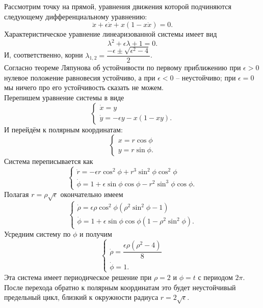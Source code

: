 \begin{example}
    Рассмотрим точку на прямой, уравнения движения которой подчиняются следующему дифференциальному уравнению:
    \[
        \ddot{x} + \epsilon \dot{x} + x(1 - x\dot{x}) = 0.
    \]
    Характеристическое уравнение линеаризованной системы имеет вид
    \[
        \lambda^2 + \epsilon \lambda + 1 = 0.
    \]
    И, соответственно, корни $\lambda_{1, 2} = \dfrac{-\epsilon \pm \sqrt {\epsilon^2 - 4}}{2}$. \\
    Согласно теореме Ляпунова об устойчивости по первому приближению при $\epsilon > 0$ нулевое положение равновесия устойчиво, а при $\epsilon < 0$ -- неустойчиво; при $\epsilon = 0$ мы ничего про его устойчивость сказать не можем. \\
    Перепишем уравнение системы в виде
    \[
        \begin{cases}
            \dot{x} = y \\
            \dot{y} = - \epsilon y - x(1 - xy).
        \end{cases}
    \]
    И перейдём к полярным координатам:
    \[
        \begin{cases}
            x = r \cos \phi \\
            y = r \sin \phi.
        \end{cases}
    \]
    Система переписывается как
    \[
        \begin{cases}
            \dot{r} = -\epsilon r \cos^2 \phi + r^3 \sin^2 \phi \cos^2 \phi \\
            \dot{\phi} = 1 + \epsilon \sin \phi \cos \phi - r^2 \sin^3 \phi \cos \phi.
        \end{cases}
    \]
    Полагая $r = \rho \sqrt {\epsilon}$ окончательно имеем
    \[
        \begin{cases}
            \dot{\rho} = \epsilon \rho \cos^2\phi (\rho^2 \sin^2 \phi - 1) \\
            \dot{\phi} = 1 + \epsilon \sin \phi \cos \phi (1 - \rho^2 \sin^2 \phi).
        \end{cases}
    \]
    Усредним систему по $\phi$ и получим
    \[
        \begin{cases}
            \dot{\rho} = \dfrac{\epsilon \rho (\rho^2 - 4)}{8} \\
            \dot{\phi} = 1.
        \end{cases}
    \]
    Эта система имеет периодическое решение при $\rho = 2$ и $\phi = t$ с периодом $2\pi$.
    После перехода обратно к полярным координатам это будет неустойчивый предельный цикл, близкий к окружности радиуса $r = 2\sqrt {\epsilon}$.
\end{example}
